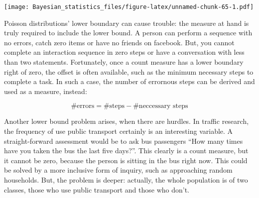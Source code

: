\documentclass[]{svmono}
\newenvironment{Shaded}{\begin{snugshade}}{\end{snugshade}}
\newcommand{\KeywordTok}[1]{\textcolor[rgb]{0.13,0.29,0.53}{\textbf{#1}}}
\newcommand{\DataTypeTok}[1]{\textcolor[rgb]{0.13,0.29,0.53}{#1}}
\newcommand{\DecValTok}[1]{\textcolor[rgb]{0.00,0.00,0.81}{#1}}
\newcommand{\StringTok}[1]{\textcolor[rgb]{0.31,0.60,0.02}{#1}}
\newcommand{\OperatorTok}[1]{\textcolor[rgb]{0.81,0.36,0.00}{\textbf{#1}}}
\newcommand{\AlertTok}[1]{\textcolor[rgb]{0.94,0.16,0.16}{#1}}
\newcommand{\NormalTok}[1]{#1}
\theoremstyle{definition}
\theoremstyle{definition}
\theoremstyle{definition}
\theoremstyle{remark}
\begin{document}
\begin{Shaded}
\end{Shaded}

\texttt{[image: Bayesian\_statistics\_files/figure-latex/unnamed-chunk-65-1.pdf]}

Poisson distributions' lower boundary can cause trouble: the measure at
hand is truly required to include the lower bound. A person can perform
a sequence with no errors, catch zero items or have no friends on
facebook. But, you cannot complete an interaction sequence in zero steps
or have a conversation with less than two statements. Fortunately, once
a count measure has a lower boundary right of zero, the offset is often
available, such as the minimum necessary steps to complete a task. In
such a case, the number of errornous steps can be derived and used as a
measure, instead:

\[
\textrm{\#errors} = \textrm{\#steps} - \textrm{\#neccessary steps}
\]

Another lower bound problem arises, when there are hurdles. In traffic
research, the frequency of use public transport certainly is an
interesting variable. A straight-forward assessment would be to ask bus
passengers ``How many times have you taken the bus the last five
days?''. This clearly is a count measure, but it cannot be zero, because
the person is sitting in the bus right now. This could be solved by a
more inclusive form of inquiry, such as approaching random households.
But, the problem is deeper: actually, the whole population is of two
classes, those who use public transport and those who don't.
\end{document}
